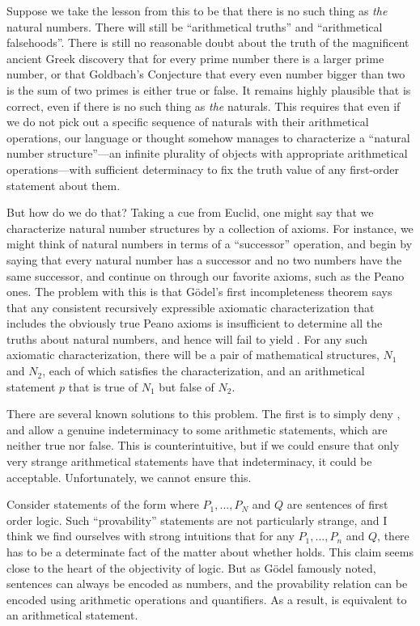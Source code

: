 Suppose we take the lesson from this to be that there is no such thing as \textit{the} natural numbers. There will still be 
``arithmetical truths'' and ``arithmetical falsehoods''. There is still no reasonable doubt about the truth of the magnificent ancient
Greek discovery that for every prime number there is a larger prime number, or that Goldbach's Conjecture that every even
number bigger than two is the sum of two primes is either true or false. It remains highly plausible that 
is correct, even if there is no such thing as \textit{the} naturals. This requires that even if we do not pick out a 
specific sequence of naturals with their arithmetical operations, our language or thought somehow manages to characterize
a ``natural number structure''---an infinite plurality of objects with appropriate arithmetical operations---with sufficient
determinacy to fix the truth value of any first-order statement about them.

But how do we do that? Taking a cue from Euclid, one might say that we characterize natural number structures by a collection
of axioms. For instance, we might think of natural numbers in terms of a ``successor'' operation, and begin by saying that every natural number has a successor and no two numbers have the same successor, and continue on through our favorite axioms, such as 
the Peano ones. The problem with this is that G\"odel's first incompleteness theorem says that any consistent recursively expressible 
axiomatic characterization that includes the obviously true Peano axioms is insufficient to determine all the truths about natural numbers, and hence will fail to yield . For any such axiomatic characterization, there will be a pair of 
mathematical structures, $N_1$ and $N_2$, each of which satisfies the characterization, and an arithmetical statement $p$ that 
is true of $N_1$ but false of $N_2$. 

There are several known solutions to this problem. The first is to simply deny , and allow a genuine 
indeterminacy to some arithmetic statements, which are neither true nor false. This is counterintuitive, but if we could 
ensure that only very strange arithmetical statements have that indeterminacy, it could be acceptable. Unfortunately, we 
cannot ensure this. 

Consider statements of the form
where $P_1,...,P_N$ and $Q$ 
are sentences of first order logic. Such ``provability'' statements are not particularly strange, and I think we find ourselves
with strong intuitions that for any $P_1,...,P_n$ and $Q$, there has to be a determinate fact of the matter about whether 
 holds. This claim seems close to the heart of the objectivity of logic. But as G\"odel famously noted, sentences
can always be encoded as numbers, and the provability relation can be encoded using arithmetic operations and quantifiers. 
As a result,  is equivalent to an arithmetical statement. 


